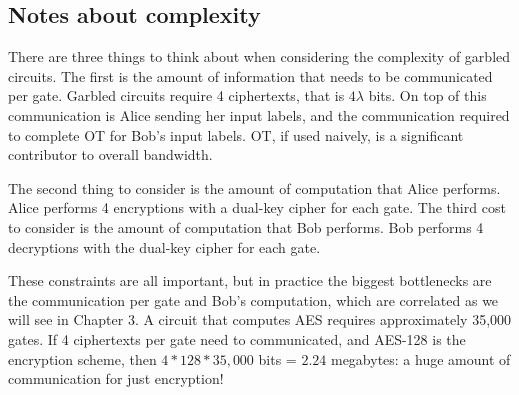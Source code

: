 \subsection{Notes about complexity}
There are three things to think about when considering the complexity of garbled circuits.
The first is the amount of information that needs to be communicated per gate.
Garbled circuits require 4 ciphertexts, that is $4\lambda$ bits.
On top of this communication is Alice sending her input labels, and the communication required to complete OT for Bob's input labels.
OT, if used naively, is a significant contributor to overall bandwidth.

The second thing to consider is the amount of computation that Alice performs.
Alice performs 4 encryptions with a dual-key cipher for each gate.
The third cost to consider is the amount of computation that Bob performs.
Bob performs 4 decryptions with the dual-key cipher for each gate.

These constraints are all important, but in practice the biggest bottlenecks are the communication per gate and Bob's computation, which are correlated as we will see in Chapter 3.
A circuit that computes AES requires approximately 35,000 gates.
If 4 ciphertexts per gate need to communicated, and AES-128 is the encryption scheme, then $4 * 128 * 35,000$ bits = $2.24$ megabytes: a huge amount of communication for just encryption!

%

